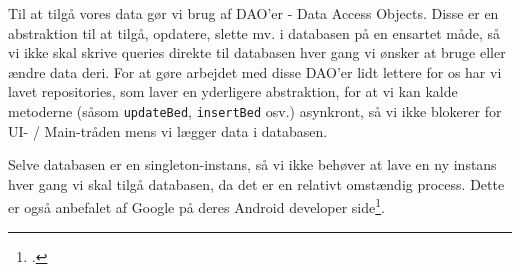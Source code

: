 Til at tilgå vores data gør vi brug af DAO'er - Data Access Objects. Disse er en abstraktion til at tilgå, opdatere, slette mv. i databasen på en ensartet måde, så vi ikke skal skrive queries direkte til databasen hver gang vi ønsker at bruge eller ændre data deri.
For at gøre arbejdet med disse DAO'er lidt lettere for os har vi lavet repositories, som laver en yderligere abstraktion, for at vi kan kalde metoderne (såsom \texttt{updateBed}, \texttt{insertBed} osv.) asynkront, så vi ikke blokerer for UI- / Main-tråden mens vi lægger data i databasen.

Selve databasen er en singleton-instans, så vi ikke behøver at lave en ny instans hver gang vi skal tilgå databasen, da det er en relativt omstændig process. Dette er også anbefalet af Google på deres Android developer side\footcite{room}.
